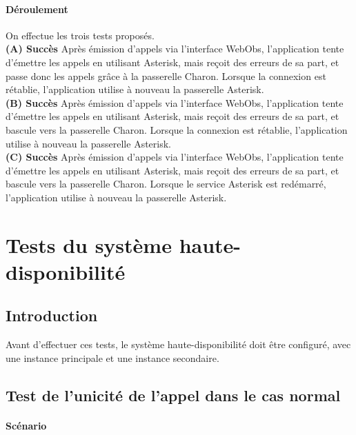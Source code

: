 \documentclass{article}
\begin{document}
\paragraph{Déroulement\\} 

On effectue les trois tests proposés.\\

\textbf{(A) Succès} Après émission d'appels via l'interface WebObs, l'application tente d'émettre les appels en utilisant Asterisk, mais reçoit des erreurs de sa part, et passe donc les appels grâce à la passerelle Charon. Lorsque la connexion est rétablie, l'application utilise à nouveau la passerelle Asterisk.\\

\textbf{(B) Succès} Après émission d'appels via l'interface WebObs, l'application tente d'émettre les appels en utilisant Asterisk, mais reçoit des erreurs de sa part, et bascule vers la passerelle Charon. Lorsque la connexion est rétablie, l'application utilise à nouveau la passerelle Asterisk.\\

\textbf{(C) Succès} Après émission d'appels via l'interface WebObs, l'application tente d'émettre les appels en utilisant Asterisk, mais reçoit des erreurs de sa part, et bascule vers la passerelle Charon. Lorsque le service Asterisk est redémarré, l'application utilise à nouveau la passerelle Asterisk.

\pagebreak
\section{Tests du système haute-disponibilité}

\subsection{Introduction}

Avant d'effectuer ces tests, le système haute-disponibilité doit être configuré, avec une instance principale et une instance secondaire. 

\subsection{Test de l'unicité de l'appel dans le cas normal}

\paragraph{Scénario}
\end{document}

